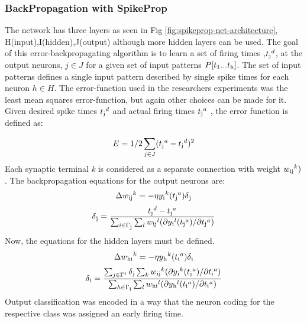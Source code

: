 \documentclass[12pt]{report}
\begin{document}
\subsubsection{BackPropagation with SpikeProp}
The network has three layers as seen in Fig \ref{fig:spikeprop-net-architecture}, H(input),I(hidden),J(output) although more hidden layers can be used. The goal of this error-backpropagating algorithm is to learn a set of firing times ,{\(t\textsubscript{j}^d\)}, at the output neurons, {\(j\in J\)} for a given set of input patterns {\(P[t\textsubscript{1}...t\textsubscript{h}]\)}. The set of input patterns defines a single input pattern described by single spike times for each neuron  {\(h\in H\)}. The error-function used in the researchers experiments was  the least mean squares error-function, but again other choices can be made for it. Given desired spike
times {\(t\textsubscript{j}^d\)} and actual firing times {\(t\textsubscript{j}^a\)} , the error function is defined as:

\begin{equation}
    E=1/2\sum_{j\in J}(t\textsubscript{j}^a-t\textsubscript{j}^d)^2
\end{equation}
Each synaptic terminal \textit{k} is considered as a separate connection with weight \(w\textsubscript{ij}^k)\). The backpropagation equations for the output neurons are:
\begin{equation}
    \Delta w\textsubscript{ij}^k=-\eta y\textsubscript{i}^k (t\textsubscript{j}^a) \delta \textsubscript{j}
\end{equation}
\begin{equation}
\delta \textsubscript{j} = \frac { t\textsubscript{j}^d-t\textsubscript{j}^a}  {\sum_{i \in \Gamma \textsubscript{j} } \sum_{l} w \textsubscript{ij}^l(\partial y \textsubscript{i}^l(t \textsubscript{j}^a) / \partial t \textsubscript{j}^a)}
\end{equation}
Now, the equations for the hidden layers must be defined.
\begin{equation}
    \Delta w\textsubscript{hi}^k=-\eta y\textsubscript{h}^k (t\textsubscript{i}^a) \delta \textsubscript{i}
\end{equation}
\begin{equation}
\delta \textsubscript{i} = \frac { \sum_{j \in \Gamma^i  }\delta\textsubscript{j}\sum_{k} w \textsubscript{ij}^k(\partial y \textsubscript{i}^k(t \textsubscript{j}^a) / \partial t \textsubscript{i}^a)}
{ \sum_{h \in \Gamma \textsubscript{i} }\sum_{l} w \textsubscript{hi}^l(\partial y \textsubscript{h}^l(t \textsubscript{i}^a) / \partial t \textsubscript{i}^a)}
\end{equation}
Output classification was encoded in a way that the neuron coding for the respective class was assigned an early firing time. 
\end{document}
